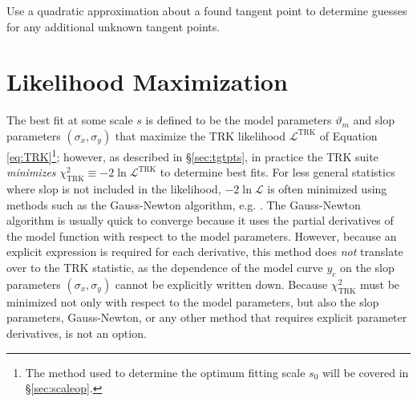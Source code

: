 \begin{algorithm}
\label{algo:quadapprox}
\caption{Use a quadratic approximation about a found tangent point to determine guesses for any additional unknown tangent points.}
\DontPrintSemicolon
\end{algorithm}

\section{Likelihood Maximization}
\label{sec:simplex}

The best fit at some scale $s$ is defined to be the model parameters $\vartheta_m$ and slop parameters $(\sigma_x,\sigma_y)$ that maximize the TRK likelihood $\mathcal{L}^\text{TRK}$ of Equation \eqref{eq:TRK}\footnote{The method used to determine the optimum fitting scale $s_0$ will be covered in \S\ref{sec:scaleop}.}; however, as described in \S\ref{sec:tgtpts}, in practice the TRK suite \textit{minimizes} $\chi^2_\text{TRK}\equiv-2\ln \mathcal{L}^\text{TRK}$ to determine best fits. For less general statistics where slop is not included in the likelihood, $-2\ln\mathcal{L}$ is often minimized using methods such as the Gauss-Newton algorithm, e.g. \textcite{maples2018robust}. The Gauss-Newton algorithm is usually quick to converge because it uses the partial derivatives of the model function with respect to the model parameters. However, because an explicit expression is required for each derivative, this method does \textit{not} translate over to the TRK statistic, as the dependence of the model curve $y_c$ on the slop parameters $(\sigma_x, \sigma_y)$ cannot be explicitly written down. Because $\chi^2_\text{TRK}$ must be minimized not only with respect to the model parameters, but also the slop parameters, Gauss-Newton, or any other method that requires explicit parameter derivatives, is not an option. 

